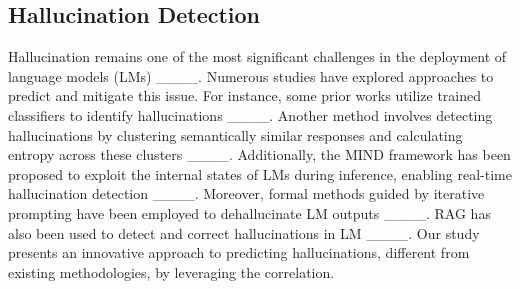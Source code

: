 \subsection{Hallucination Detection}

Hallucination remains one of the most significant challenges in the deployment of language models (LMs) ____. Numerous studies have explored approaches to predict and mitigate this issue. For instance, some prior works utilize trained classifiers to identify hallucinations ____. Another method involves detecting hallucinations by clustering semantically similar responses and calculating entropy across these clusters ____. Additionally, the MIND framework has been proposed to exploit the internal states of LMs during inference, enabling real-time hallucination detection ____. Moreover, formal methods guided by iterative prompting have been employed to dehallucinate LM outputs ____. RAG has also been used to detect and correct hallucinations in LM ____. Our study presents an innovative approach to predicting hallucinations, different from existing methodologies, by leveraging the correlation.